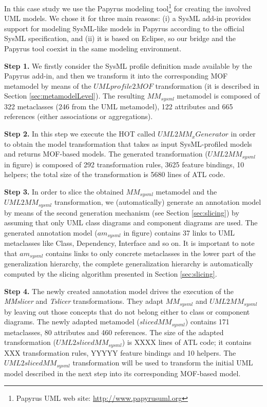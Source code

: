 In this case study we use the Papyrus modeling tool\footnote{Papyrus UML web site: \small{\url{http://www.papyrusuml.org}}} for
creating the involved UML models. We chose it for three main reasons: 
(i) a SysML add-in provides support for modeling SysML-like models in Papyrus according to the official SysML specification, and 
(ii) it is based on Eclipse, so our bridge and the Papyrus tool coexist in the same modeling environment.

\textbf{Step 1.} We firstly consider the SysML profile definition made available by the Papyrus add-in,
and then we transform it into the corresponding MOF metamodel
by means of the $UMLprofile2MOF$ transformation (it is described in Section \ref{sec:metamodelLevel}). 
The resulting $MM_{sysml}$ metamodel is composed of 322 metaclasses (246 from the UML metamodel), 
122 attributes and 665 references (either associations or aggregations).

\textbf{Step 2.} In this step we execute the HOT called $UML2MM_xGenerator$ in order to obtain the
model transformation that takes as input SysML-profiled models and returns MOF-based models. The generated transformation 
($UML2MM_{sysml}$ in figure) is composed of 292 transformation rules, 3625 feature bindings, 10 helpers; the total size of the transformation is 5680 lines of ATL code.

\textbf{Step 3.} In order to slice the obtained $MM_{sysml}$ metamodel and the $UML2MM_{sysml}$ transformation, 
we (automatically) generate an annotation model by means of the second generation mechanism
(see Section \ref{sec:slicing}) by assuming that only UML class diagrams and component diagrams are used.
The generated annotation model ($am_{sysml}$ in figure) contains 37 links to UML metaclasses like Class, Dependency, Interface and so on.
It is important to note that $am_{sysml}$ contains links to only concrete metaclasses in the lower part of the generalization hierarchy, the complete generalization hierarchy is automatically computed by the slicing algorithm presented in Section \ref{sec:slicing}.

\textbf{Step 4.} The newly created annotation model drives the execution of the \textit{MMslicer} and \textit{Tslicer} transformations.
They adapt $MM_{sysml}$ and $UML2MM_{sysml}$ by leaving out those concepts that do not
belong either to class or component diagrams. 
The newly adapted metamodel ($slicedMM_{sysml}$) contains 171 metaclasses, 80 attributes and 460 references. 
\ivano{} The size of the adapted transformation ($UML2slicedMM_{sysml}$) is XXXX lines 
of ATL code; it contains XXX transformation rules, YYYYY feature bindings and 10 helpers. 
The $UML2slicedMM_{sysml}$ transformation will be used to transform the initial UML model described in the next step into its 
corresponding MOF-based model.

